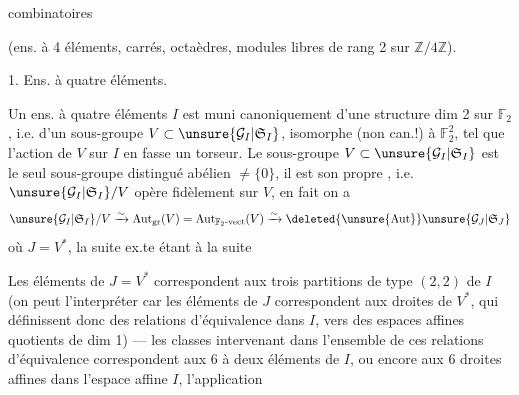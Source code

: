  combinatoires

(ens. à 4 éléments, carrés, octaèdres,
modules libres de rang 2 sur $\mathbb{Z}/4\mathbb{Z}$).

1. Ens. à quatre éléments.

Un ens. à quatre éléments $I$ est muni canoniquement d'une structure
 dim 2 sur $\mathbb{F}_2$, i.e. d'un sous-groupe
$V\subset \unsure{\mathcal{G}_I|\mathfrak{S}_I}$, isomorphe (non can.!) à $\mathbb{F}_2^2$,
tel que l'action de $V$ sur  $I$ en fasse un torseur.
Le sous-groupe $V\subset \unsure{\mathcal{G}_I|\mathfrak{S}_I}$ est le seul sous-groupe
distingué abélien $\ne\{0\}$,  il est son propre
, i.e.
$\unsure{\mathcal{G}_I|\mathfrak{S}_I}/V$ opère fidèlement sur $V$, en fait on a
\[
 \unsure{\mathcal{G}_I|\mathfrak{S}_I}/V
 \xrightarrow{\sim}\operatorname{Aut}_{\mathrm{gr}}(V)
 =\operatorname{Aut}_{\mathbb{F}_2\text{-vect}}(V)
 \xrightarrow{\sim}\deleted{\unsure{\operatorname{Aut}}}\unsure{\mathcal{G}_J|\mathfrak{S}_J}
\]
où $J=V^*$, la suite ex.te
étant  à la suite

Les  éléments de $J=V^*$ correspondent aux trois
partitions de type $(2,2)$ de $I$ 
(on peut l'interpréter  car les éléments de $J$ correspondent
aux droites  de $V^*$, qui définissent
 donc des  relations d'équivalence
dans $I$, vers des espaces affines quotients de dim 1) --- les classes
intervenant dans l'ensemble de ces  relations d'équivalence
correspondent aux 6 
à deux éléments de $I$, ou encore aux 6 droites affines dans l'espace affine $I$,
l'application

